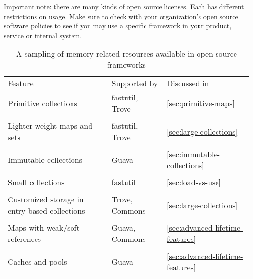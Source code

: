 Important note: there are many kinds of open source licenses. Each has different
restrictions on usage. Make sure to check with your organization's open
source software policies to see if you may use a specific framework in 
your product, service or internal system.

\begin{table}
\centering
	\begin{tabular}{p{6cm} p{3cm} p{4cm}}
	\toprule

	   Feature & Supported by & Discussed in
	\\ \cmidrule(r){1-1} \cmidrule(l){2-2} \cmidrule(l){3-3}
	Primitive collections & fastutil, Trove & \autoref{sec:primitive-maps}
	\\
	\\
	Lighter-weight maps and sets & fastutil, Trove &
	\autoref{sec:large-collections}
	\\
	\\
	Immutable collections & Guava & \autoref{sec:immutable-collections}
	\\
	\\
	Small collections & fastutil & \autoref{sec:load-vs-use}
	\\
	\\
	Customized storage in entry-based collections & Trove, Commons &
	\autoref{sec:large-collections}
	\\
	\\
	Maps with weak/soft references & Guava, Commons &
	\autoref{sec:advanced-lifetime-features}
	\\
	\\
	Caches and pools & Guava & \autoref{sec:advanced-lifetime-features}
	\\
	\bottomrule
	\end{tabular}
	\caption{A sampling of memory-related resources available in open source
	frameworks}
	\label{tab:alternative-collections}
\end{table}


